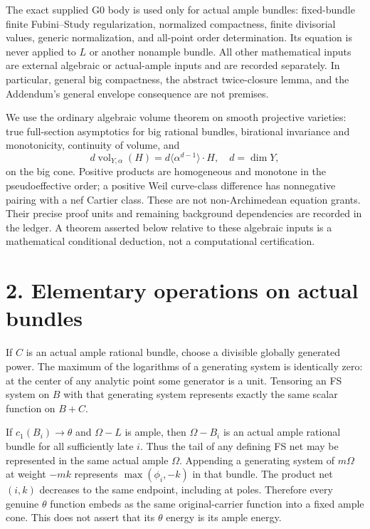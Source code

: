 \documentclass[
  10pt,
]{article}
\begin{document}
The exact supplied G0 body is used only for actual ample bundles:
fixed-bundle finite Fubini--Study regularization, normalized
compactness, finite divisorial values, generic normalization, and
all-point order determination. Its equation is never applied to \(L\) or
another nonample bundle. All other mathematical inputs are external
algebraic or actual-ample inputs and are recorded separately. In
particular, general big compactness, the abstract twice-closure lemma,
and the Addendum's general envelope consequence are not premises.

We use the ordinary algebraic volume theorem on smooth projective
varieties: true full-section asymptotics for big rational bundles,
birational invariance and monotonicity, continuity of volume, and
\[d\operatorname{vol}_{Y,\alpha}(H)
=d\langle\alpha^{d-1}\rangle\cdot H,
\quad d=\dim Y,\] on the big cone. Positive products are homogeneous and
monotone in the pseudoeffective order; a positive Weil curve-class
difference has nonnegative pairing with a nef Cartier class. These are
not non-Archimedean equation grants. Their precise proof units and
remaining background dependencies are recorded in the ledger. A theorem
asserted below relative to these algebraic inputs is a mathematical
conditional deduction, not a computational certification.

\section{2. Elementary operations on actual
bundles}\label{elementary-operations-on-actual-bundles}

If \(C\) is an actual ample rational bundle, choose a divisible globally
generated power. The maximum of the logarithms of a generating system is
identically zero: at the center of any analytic point some generator is
a unit. Tensoring an FS system on \(B\) with that generating system
represents exactly the same scalar function on \(B+C\).

If \(c_1(B_i)\to\theta\) and \(\Omega-L\) is ample, then \(\Omega-B_i\)
is an actual ample rational bundle for all sufficiently late \(i\). Thus
the tail of any defining FS net may be represented in the same actual
ample \(\Omega\). Appending a generating system of \(m\Omega\) at weight
\(-mk\) represents \(\max(\phi_i,-k)\) in that bundle. The product net
\((i,k)\) decreases to the same endpoint, including at poles. Therefore
every genuine \(\theta\) function embeds as the same original-carrier
function into a fixed ample cone. This does not assert that its
\(\theta\) energy is its ample energy.
\end{document}
